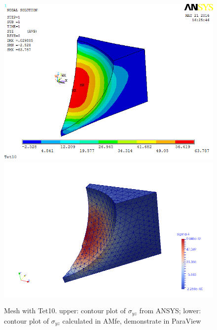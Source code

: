 \begin{figure}[htbp]
	\begin{center}
		\includegraphics[width=13cm,clip]{Tet10_Syz.png} 		
		\includegraphics[width=13cm,clip]{Tet10_Syz_P.png} 		
		\caption{Mesh with Tet10. upper: contour plot of $\sigma_{yz}$ from ANSYS; lower: contour plot of $\sigma_{yz}$ calculated in AMfe, demonstrate in ParaView} \label{fig: Tet10_Syz}
	\end{center}
\end{figure}
\clearpage 

